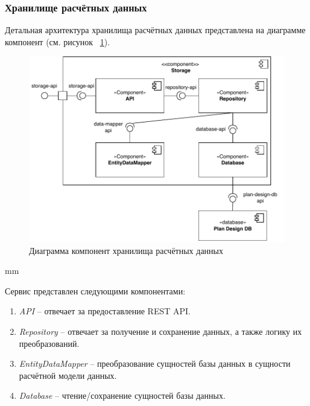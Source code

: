 \subsubsection{\large{Хранилище расчётных данных}}

Детальная архитектура хранилища расчётных данных представлена на диаграмме компонент
(см. рисунок \ \ref{pic:architecture__storage-component}).

\begin{figure}[H]
	\includegraphics[width=\textwidth]{architecture/pictures/storage/component_common}
	\caption{Диаграмма компонент хранилища расчётных данных}
	\label{pic:architecture__storage-component}
\end{figure}
 mm

Сервис представлен следующими компонентами:
\begin{enumerate}
	\item {
		\textit{API} -- отвечает за предоставление REST API.
	}
	\item {
		\textit{Repository} -- отвечает за получение и сохранение данных, а также логику их преобразований.
	}
	\item {
		\textit{EntityDataMapper} -- преобразование сущностей базы данных в сущности расчётной модели данных.
	}
	\item {
		\textit{Database} -- чтение/сохранение сущностей базы данных.
	}
\end{enumerate}